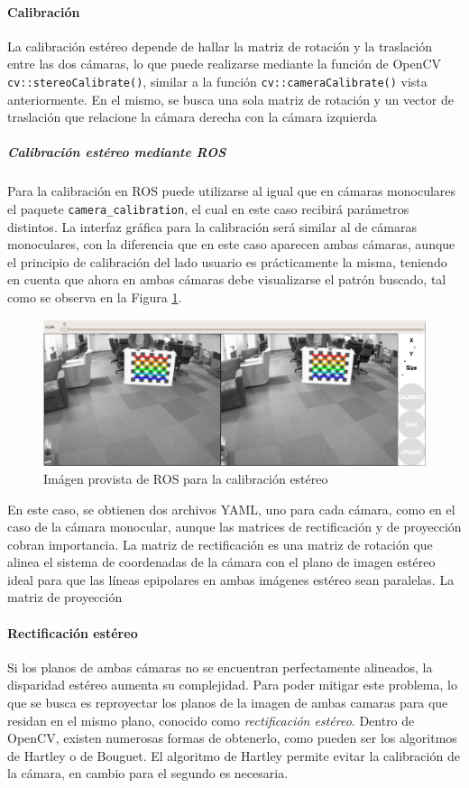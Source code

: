 \paragraph{Calibración}
La calibración estéreo depende de hallar la matriz de rotación y la traslación entre las dos cámaras, lo que puede realizarse mediante la función de OpenCV \texttt{cv::stereoCalibrate()}, similar a la función \texttt{cv::cameraCalibrate()} vista anteriormente. En el mismo, se busca una sola matriz de rotación y un vector de traslación que relacione la cámara derecha con la cámara izquierda
\subparagraph{Calibración estéreo mediante ROS}
Para la calibración en ROS puede utilizarse al igual que en cámaras monoculares el paquete \texttt{camera\_calibration}, el cual en este caso recibirá parámetros distintos. La interfaz gráfica para la calibración será similar al de cámaras monoculares, con la diferencia que en este caso aparecen ambas cámaras, aunque el principio de calibración del lado usuario es prácticamente la misma, teniendo en cuenta que ahora en ambas cámaras debe visualizarse el patrón buscado, tal como se observa en la Figura \ref{fig:stereocalibrationchessboard}.
\begin{figure}
    \centering
    \includegraphics[width=\textwidth]{Img/StereoCalibrationChessboard.png}
    \caption{Imágen provista de ROS para la calibración estéreo}
    \label{fig:stereocalibrationchessboard}
\end{figure}

En este caso, se obtienen dos archivos YAML, uno para cada cámara, como en el caso de la cámara monocular, aunque las matrices de rectificación y de proyección cobran importancia. La matriz de rectificación es una matriz de rotación que alinea el sistema de coordenadas de la cámara con el plano de imagen estéreo ideal para que las líneas epipolares en ambas imágenes estéreo sean paralelas. La matriz de proyección

\paragraph{Rectificación estéreo}
Si los planos de ambas cámaras no se encuentran perfectamente alineados, la disparidad estéreo aumenta su complejidad. Para poder mitigar este problema, lo que se busca es reproyectar los planos de la imagen de ambas camaras para que residan en el mismo plano, conocido como \textit{rectificación estéreo}. Dentro de OpenCV, existen numerosas formas de obtenerlo, como pueden ser los algoritmos de Hartley o de Bouguet. El algoritmo de Hartley permite evitar la calibración de la cámara, en cambio para el segundo es necesaria.

